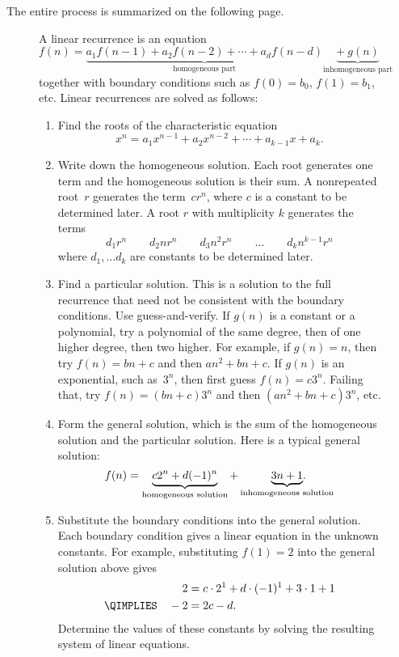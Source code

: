 The entire process is summarized on the following page.

\begin{figure}[p]\redrawntrue

\begin{pagesidebar}[to \textheight]

A linear recurrence is an equation
\begin{equation*}
f(n) = \underbrace{a_1 f(n-1) + a_2 f(n-2) + \cdots + a_d f(n -
  d)}_{\text{homogeneous part}}
\underbrace{+\ g(n)}_{\text{inhomogeneous part}}
\end{equation*}
together with boundary conditions such as $f(0) = b_0$, $f(1) = b_1$,
etc.  Linear recurrences are solved as follows:

\begin{enumerate}
\item Find the roots of the characteristic equation
\begin{equation*}
x^n = a_1 x^{n-1} + a_2 x^{n-2} + \cdots + a_{k-1} x + a_k.
\end{equation*}
\item Write down the homogeneous solution.  Each root generates one
  term and the homogeneous solution is their sum.  A nonrepeated
  root~$r$ generates the term~$c r^n$, where $c$ is a constant to be 
  determined later.  A root $r$ with multiplicity $k$ generates the
  terms
\[
d_{1} r^n \qquad d_2 n r^n \qquad d_3 n^2 r^n \qquad \dots \qquad d_k n^{k-1} r^n
\]
where $d_1, \dots d_k$ are constants to be determined later.
\item Find a particular solution.  This is a solution to the full
  recurrence that need not be consistent with the boundary conditions.
  Use guess-and-verify.  If $g(n)$ is a constant or a polynomial, try
  a polynomial of the same degree, then of one higher degree, then two
  higher.  For example, if $g(n) = n$, then try $f(n) = bn + c$ and
  then $an^2 + bn + c$.  If $g(n)$ is an exponential, such as~$3^n$,
  then first guess $f(n) = c3^n$.  Failing that, try $f(n) = (bn + c) 3^n$
  and then $(an^2 + bn + c)3^n$, etc.
\item Form the general solution, which is the sum of the homogeneous
  solution and the particular solution.  Here is a typical general
  solution:
\begin{equation*}
f(n) = \underbrace{c2^n + d(-1)^n}_{\text{homogeneous solution}} +
\underbrace{3n + 1\rlap{.}}_{\text{inhomogeneous solution}}
\end{equation*}
\item Substitute the boundary conditions into the general solution.
  Each boundary condition gives a linear equation in the unknown
  constants.  For example, substituting $f(1) = 2$ into the general
  solution above gives
\begin{align*}
2 & = c\cdot2^1 + d \cdot(-1)^1 + 3 \cdot 1 + 1 \\
\QIMPLIES \quad -2 & = 2c - d.
\end{align*}
Determine the values of these constants by solving the resulting
system of linear equations.
\end{enumerate}
\end{pagesidebar}


\end{figure}
